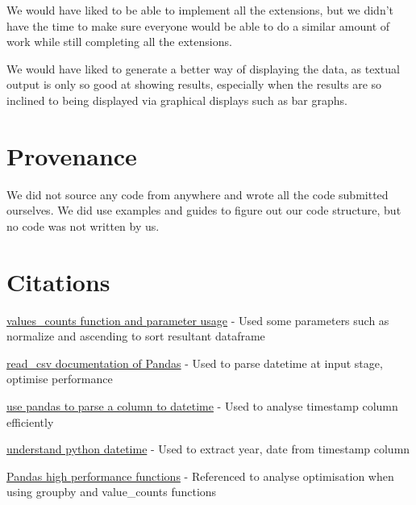 \documentclass[12pt,a4paper,final]{article}
\begin{document}
We would have liked to be able to implement all the extensions, but we didn't have the time to make sure everyone would be able to do a similar amount of work while still completing all the extensions.

We would have liked to generate a better way of displaying the data, as textual output is only so good at showing results, especially when the results are so inclined to being displayed via graphical displays such as bar graphs.

\section*{Provenance}

We did not source any code from anywhere and wrote all the code submitted ourselves. We did use examples and guides to figure out our code structure, but no code was not written by us.

\section*{Citations}

\noindent
\href{https://www.w3resource.com/pandas/series/series-value_counts.php}{values\_counts function and parameter usage}
\newline - Used some parameters such as normalize and ascending to sort resultant dataframe

\noindent
\href{https://pandas.pydata.org/pandas-docs/stable/reference/api/pandas.read_csv.html}{read\_csv documentation of Pandas}
\newline - Used to parse datetime at input stage, optimise performance

\noindent
\href{https://pandas.pydata.org/pandas-docs/stable/reference/api/pandas.to_datetime.html}{use pandas to parse a column to datetime}
\newline - Used to analyse timestamp column efficiently

\noindent
\href{https://docs.python.org/3/library/datetime.html} {understand python datetime}
\newline - Used to extract year, date from timestamp column

\noindent
\href{https://books.google.co.uk/books?id=LcHgDwAAQBAJ&pg=PT337&lpg=PT337&dq=pandas+value_counts+performance&source=bl&ots=bgNWdiwkVC&sig=ACfU3U0bGo5e7tdN6bztLRuGNm3EC1vI6Q&hl=en&sa=X&ved=2ahUKEwjzpMjT9JzpAhXDTxUIHXdJDBgQ6AEwBnoECAoQAQ#v=onepage&q=pandas%20value_counts%20performance&f=false} {Pandas high performance functions}
\newline - Referenced to analyse optimisation when using groupby and value\_counts functions
\end{document}
